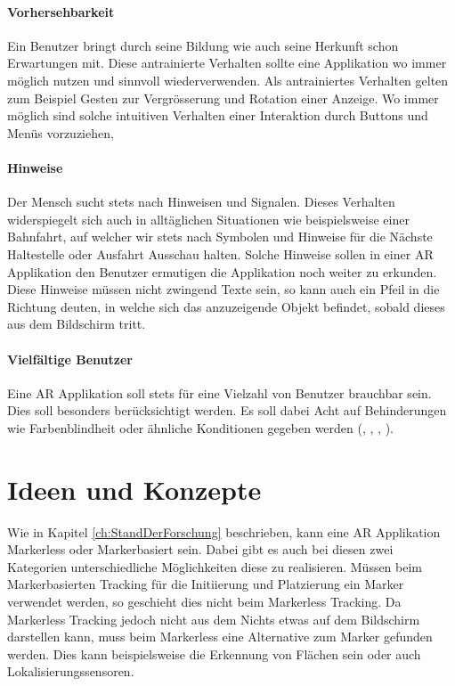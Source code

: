 \documentclass[a4paper]{scrreprt}
\begin{document}
\subsubsection{Vorhersehbarkeit}
Ein Benutzer bringt durch seine Bildung wie auch seine Herkunft schon Erwartungen mit. Diese antrainierte Verhalten sollte eine Applikation wo immer möglich nutzen und sinnvoll wiederverwenden. Als antrainiertes Verhalten gelten zum Beispiel Gesten zur Vergrösserung und Rotation einer Anzeige. Wo immer möglich sind solche intuitiven Verhalten einer Interaktion durch Buttons und Menüs vorzuziehen,

\subsubsection{Hinweise}
Der Mensch sucht stets nach Hinweisen und Signalen. Dieses Verhalten widerspiegelt sich auch in alltäglichen Situationen wie beispielsweise einer Bahnfahrt, auf welcher wir stets nach Symbolen und Hinweise für die Nächste Haltestelle oder Ausfahrt Ausschau halten.
Solche Hinweise sollen in einer AR Applikation den Benutzer ermutigen die Applikation noch weiter zu erkunden.
Diese Hinweise müssen nicht zwingend Texte sein, so kann auch ein Pfeil in die Richtung deuten, in welche sich das anzuzeigende Objekt befindet, sobald dieses aus dem Bildschirm tritt.

\subsubsection{Vielfältige Benutzer}
Eine AR Applikation soll stets für eine Vielzahl von Benutzer brauchbar sein. Dies soll besonders berücksichtigt werden. Es soll dabei Acht auf Behinderungen wie Farbenblindheit oder ähnliche Konditionen gegeben werden (\cite{AppleGuideline2018}, \cite{GoogleGuideline2018}, \cite{GoogleIO2018}, \cite{BerfinAyhan2017}).

\chapter{Ideen und Konzepte}
Wie in Kapitel \ref{ch:StandDerForschung} beschrieben, kann eine AR Applikation Markerless oder Markerbasiert sein. Dabei gibt es auch bei diesen zwei Kategorien unterschiedliche Möglichkeiten diese zu realisieren. Müssen beim Markerbasierten Tracking für die Initiierung und Platzierung ein Marker verwendet werden, so geschieht dies nicht beim Markerless Tracking.
Da Markerless Tracking jedoch nicht aus dem Nichts etwas auf dem Bildschirm darstellen kann, muss beim Markerless eine Alternative zum Marker gefunden werden. Dies kann beispielsweise die Erkennung von Flächen sein \parencite{GoogleARCore2018} oder auch Lokalisierungssensoren.
\end{document}
